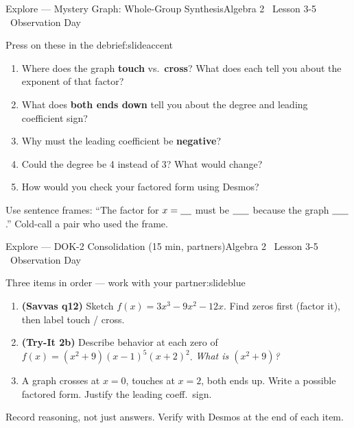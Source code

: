 \documentclass[aspectratio=169, 11pt]{beamer}
\begin{document}
\begin{frame}{Explore --- Mystery Graph: Whole-Group Synthesis}{Algebra 2 \textperiodcentered\ Lesson 3-5 \textperiodcentered\ Observation Day}
\vspace{0.15cm}
\begin{projcard}{Press on these in the debrief:}{slideaccent}
\begin{enumerate}
  \setlength{\itemsep}{0.3cm}
  \item Where does the graph \textbf{touch} vs.\ \textbf{cross}? What does each tell you about the exponent of that factor?
  \item What does \textbf{both ends down} tell you about the degree and leading coefficient sign?
  \item Why must the leading coefficient be \textbf{negative}?
  \item Could the degree be 4 instead of 3? What would change?
  \item How would you check your factored form using Desmos?
\end{enumerate}
\end{projcard}
\vspace{0.1cm}
\small\textcolor{slidegray}{Use sentence frames: ``The factor for $x = \underline{\hspace{0.4cm}}$ must be $\underline{\hspace{0.6cm}}$ because the graph $\underline{\hspace{0.6cm}}$.'' Cold-call a pair who used the frame.}
\end{frame}

\begin{frame}{Explore --- DOK-2 Consolidation (15 min, partners)}{Algebra 2 \textperiodcentered\ Lesson 3-5 \textperiodcentered\ Observation Day}
\vspace{0.15cm}
\begin{projcard}{Three items in order --- work with your partner:}{slideblue}
\begin{enumerate}
  \setlength{\itemsep}{0.4cm}
  \item \textbf{(Savvas q12)} Sketch $f(x) = 3x^3 - 9x^2 - 12x$.
        Find zeros first (factor it), then label touch / cross.
  \item \textbf{(Try-It 2b)} Describe behavior at each zero of
        $f(x) = (x^2+9)(x-1)^5(x+2)^2$.
        \textit{What is $(x^2+9)$?}
  \item A graph crosses at $x = 0$, touches at $x = 2$, both ends up.
        Write a possible factored form. Justify the leading coeff.\ sign.
\end{enumerate}
\vspace{0.15cm}
\small\textcolor{slidegray}{Record reasoning, not just answers.
Verify with Desmos at the end of each item.}
\end{projcard}
\end{frame}
\end{document}
